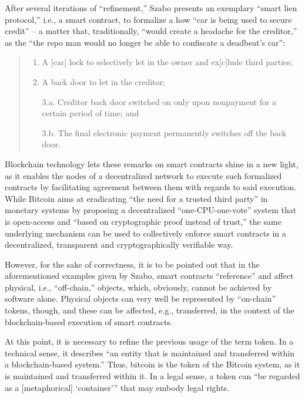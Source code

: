 After several iterations of ``refinement,'' Szabo presents an exemplary ``smart lien protocol,'' i.e., a smart contract, to formalize a how ``car is being used to secure credit'' -- a matter that, traditionally, ``would create a headache for the creditor,'' as the ``the repo man would no longer be able to confiscate a deadbeat's car'': \autocite{uva1997smartcontracts}

\begin{quote}
  \begin{enumerate}
    \item A [car] lock to selectively let in the owner and ex[c]lude third parties;
    \item A back door to let in the creditor;
    \item[3.a.] Creditor back door switched on only upon nonpayment for a certain period of time; and
    \item[3.b.] The final electronic payment permanently switches off the back door.
  \end{enumerate}
\end{quote}

Blockchain technology lets these remarks on smart contracts shine in a new light, as it enables the nodes of a decentralized network to execute such formalized contracts by facilitating agreement between them with regards to said execution.
While Bitcoin aims at eradicating ``the need for a trusted third party'' in monetary systems by proposing a decentralized ``one-CPU-one-vote'' system that is open-access and ``based on cryptographic proof instead of trust,'' \autocite[1, 3]{bitcoin2008paper} the same underlying mechanism can be used to collectively enforce smart contracts in a decentralized, transparent and cryptographically verifiable way.

However, for the sake of correctness, it is to be pointed out that in the aforementioned examples given by Szabo, smart contracts ``reference'' \autocite{uva1997smartcontracts} and affect physical, i.e., ``off-chain,'' objects, which, obviously, cannot be achieved by software alone.
Physical objects can very well be represented by ``on-chain'' tokens, though, and these can be affected, e.g., transferred, in the context of the blockchain-based execution of smart contracts.

At this point, it is necessary to refine the previous usage of the term token.
In a technical sense, it describes ``an entity that is maintained and transferred within a blockchain-based system.'' \autocite[15]{github2020blockchaintokens}
Thus, bitcoin is the token of the Bitcoin system, as it is maintained and transferred within it.
In a legal sense, a token can \enquote{be regarded as a [metaphorical] \enquote{container}} that may embody legal rights. \autocites[15]{github2020blockchaintokens}[55, 57]{naegele2019tvtg}

